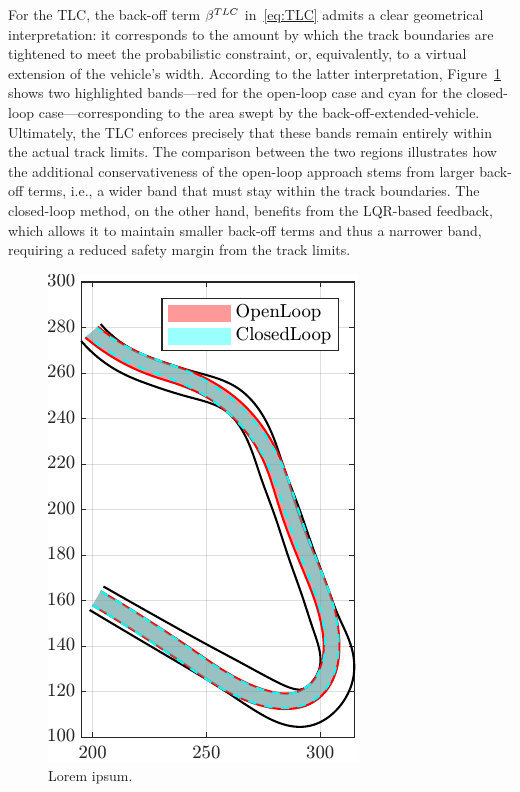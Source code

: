 For the TLC, the back-off term $\beta^{TLC}$ in~\eqref{eq:TLC} admits a clear geometrical interpretation: it corresponds to the amount by which the track boundaries are tightened to meet the probabilistic constraint, or, equivalently, to a virtual extension of the vehicle's width. According to the latter interpretation, Figure~\ref{fig:olcl_traj_bands} shows two highlighted bands---red for the open-loop case and cyan for the closed-loop case---corresponding to the area swept by the back-off-extended-vehicle. Ultimately, the TLC enforces precisely that these bands remain entirely within the actual track limits. The comparison between the two regions illustrates how the additional conservativeness of the open-loop approach stems from larger back-off terms, i.e., a wider band that must stay within the track boundaries. The closed-loop method, on the other hand, benefits from the LQR-based feedback, which allows it to maintain smaller back-off terms and thus a narrower band, requiring a reduced safety margin from the track limits.
\begin{figure}
	\centering
	\includegraphics{Fig/olcl_traj_bands.pdf}
	\caption{Lorem ipsum.}
	\label{fig:olcl_traj_bands}
\end{figure}



